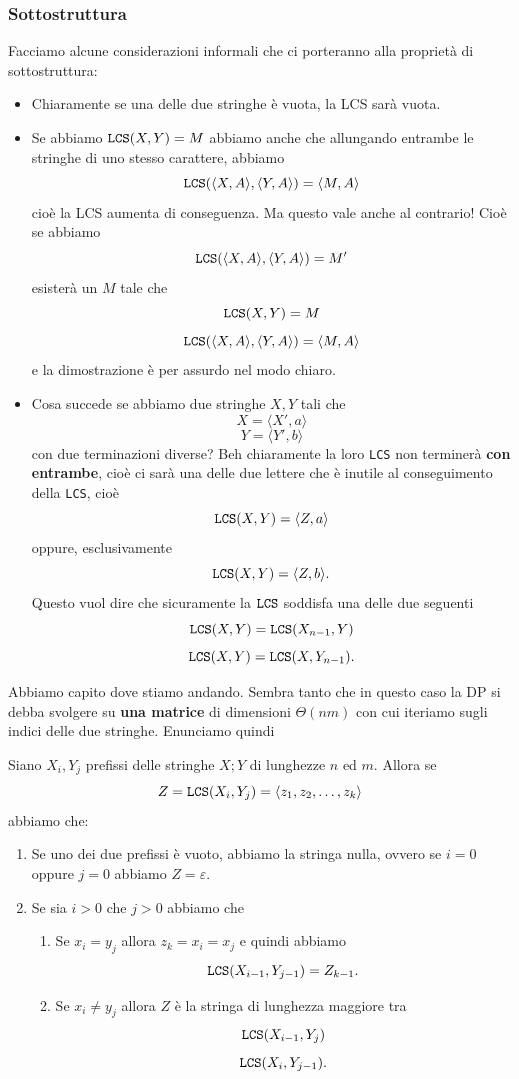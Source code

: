 \documentclass[11pt]{scrartcl}
\newcommand{\bigtheta}[1]{\Theta\!\left(#1\right)}
\begin{document}
	\subsubsection{Sottostruttura}
	
	Facciamo alcune considerazioni informali che ci porteranno alla proprietà di sottostruttura:
	\begin{itemize}
		\item Chiaramente se una delle due stringhe è vuota, la LCS sarà vuota.
		\item Se abbiamo $\verb*|LCS|(X,Y)=M$ abbiamo anche che allungando entrambe le stringhe di uno stesso carattere, abbiamo
		$$\verb*|LCS|(\langle X,A\rangle,\langle Y,A\rangle)=\langle M,A\rangle$$
		cioè la LCS aumenta di conseguenza. Ma questo vale anche al contrario! Cioè se abbiamo
		$$\verb*|LCS|(\langle X,A\rangle,\langle Y,A\rangle)=M'$$
		esisterà un $M$ tale che 
		$$\verb*|LCS|(X,Y)=M$$
		$$\verb*|LCS|(\langle X,A\rangle,\langle Y,A\rangle)=\langle M,A\rangle$$
		e la dimostrazione è per assurdo nel modo chiaro.
		\item Cosa succede se abbiamo due stringhe $X,Y$ tali che
		$$X=\langle X',a \rangle$$
		$$Y=\langle Y',b \rangle$$
		con due terminazioni diverse? Beh chiaramente la loro \verb*|LCS| non terminerà \textbf{con entrambe}, cioè ci sarà una delle due lettere che è inutile al conseguimento della \verb*|LCS|, cioè
		$$\verb*|LCS|(X,Y)=\langle Z,a \rangle$$
		oppure, esclusivamente
		$$\verb*|LCS|(X,Y)=\langle Z,b \rangle.$$
		Questo vuol dire che sicuramente la $\verb*|LCS|$ soddisfa una delle due seguenti
		$$\verb*|LCS|(X,Y)=\verb*|LCS|(X_{n-1},Y)$$
		$$\verb*|LCS|(X,Y)=\verb*|LCS|(X,Y_{n-1}).$$
	\end{itemize}
	Abbiamo capito dove stiamo andando. Sembra tanto che in questo caso la DP si debba svolgere su \textbf{una matrice} di dimensioni $\bigtheta{nm}$ con cui iteriamo sugli indici delle due stringhe. Enunciamo quindi
	\begin{theorem}
		Siano $X_i,Y_j$ prefissi delle stringhe $X;Y$ di lunghezze $n$ ed $m$. Allora se 
		$$Z=\verb*|LCS|(X_i,Y_j)=\langle z_1,z_2,\dots,z_k\rangle$$
		abbiamo che:
		\begin{enumerate}
			\item Se uno dei due prefissi è vuoto, abbiamo la stringa nulla, ovvero se $i=0$ oppure $j=0$ abbiamo $Z=\varepsilon$.
			\item Se sia $i>0$ che $j>0$ abbiamo che 
			\begin{enumerate}
				\item Se $x_i=y_j$ allora $z_k=x_i=x_j$ e quindi abbiamo
				$$\verb*|LCS|(X_{i-1},Y_{j-1})=Z_{k-1}.$$
				\item Se $x_i\ne y_j$ allora $Z$ è la stringa di lunghezza maggiore tra 
				$$\verb*|LCS|(X_{i-1},Y_j)$$
				$$\verb*|LCS|(X_{i},Y_{j-1}).$$
			\end{enumerate}
		\end{enumerate}
	\end{theorem}
\end{document}
